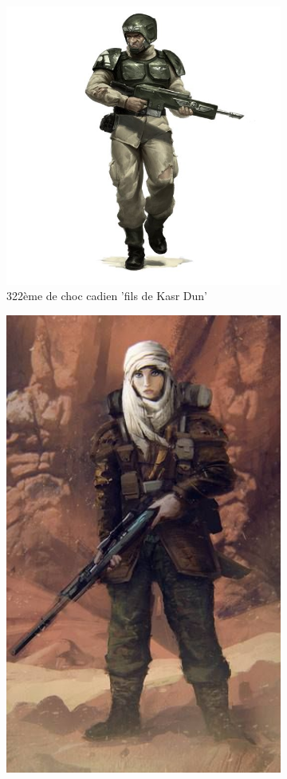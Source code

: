 \documentclass[10pt,a4paper]{book}
\begin{document}
\begin{figure}
\begin{center}
\begin{subfigure}[b]{0.3\textwidth}
     \centering \includegraphics[height = 0.3\textheight]{cadians.jpg}
     \caption{322ème de choc cadien 'fils de Kasr Dun'}
\end{subfigure}
\begin{subfigure}[b]{0.3\textwidth}
     \centering \includegraphics[height = 0.3\textheight]{tallarn.jpg}

\end{subfigure}
\end{center}
\end{figure}
\end{document}
